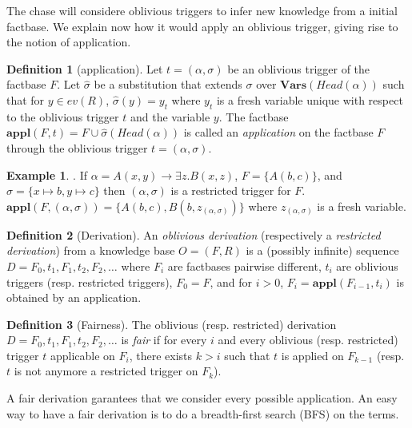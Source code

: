 \documentclass{article}
\theoremstyle{definition}
\newtheorem{definition}{Definition}[section]
\newtheorem{example}{Example}[section]
\theoremstyle{remark}
\newcommand{\Vars}{\textbf{Vars}}
\newcommand{\Appl}{\textbf{appl}}
\begin{document}
The chase will considere oblivious triggers to infer new knowledge from a initial factbase. We explain now how it would apply an oblivious trigger, giving rise to the notion of application. 

\begin{definition}[application]
Let $t = (\alpha,\sigma)$ be an oblivious trigger of the factbase $F$. Let $\hat \sigma$ be a substitution that extends $\sigma$ over $\Vars(\textit{Head}(\alpha))$ such that for $y \in \textit{ev}(R)$, $\hat \sigma(y) = y_t$ where $y_t$ is a fresh variable unique with respect to the oblivious trigger $t$ and the variable $y$.
The factbase $\Appl(F,t)=F \cup \hat \sigma(\textit{Head}(\alpha))$ is called an \emph{application} on the factbase $F$ through the oblivious trigger $t = (\alpha,\sigma)$.
\end{definition}

\begin{example}. If $\alpha = A(x,y) \rightarrow \exists z.B(x,z)$, $F = \{A(b,c)\}$, and $\sigma = \{x \mapsto b, y \mapsto c \}$ then $(\alpha,\sigma)$ is a restricted trigger for $F$. $\Appl(F,(\alpha,\sigma)) = \{A(b,c),B(b,z_{(\alpha,\sigma)})\}$ where $z_{(\alpha,\sigma)}$ is a fresh variable.
\end{example}

\begin{definition}[Derivation]
An \emph{oblivious derivation} (respectively a \emph{restricted derivation}) from a knowledge base $O= (F,R)$ is a (possibly infinite) sequence $D=F_0,t_1,F_1,t_2,F_2,\ldots$ where $F_i$ are factbases pairwise different, $t_i$ are oblivious triggers (resp. restricted triggers), $F_0 = F$, and for $i >0$, $F_{i}= \Appl(F_{i-1},t_i)$ is obtained by an application.
\end{definition}


\begin{definition}[Fairness]
The oblivious (resp. restricted) derivation $D=F_0,t_1,F_1,t_2,F_2,\ldots$ is \emph{fair} if for every $i$ and every oblivious (resp. restricted) trigger $t$ applicable on $F_i$, there exists $k > i$ such that $t$ is applied on $F_{k-1}$ (resp. $t$ is not anymore a restricted trigger on $F_k$).
\end{definition}

A fair derivation garantees that we consider every possible application. An easy way to have a fair derivation is to do a breadth-first search (BFS) on the terms.
\end{document}
